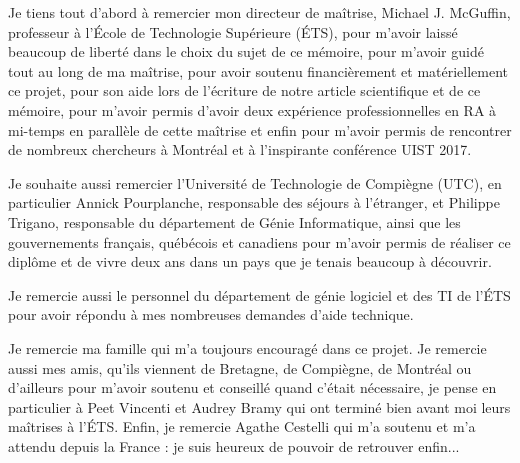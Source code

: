 Je tiens tout d'abord à remercier mon directeur de maîtrise, Michael J. McGuffin, professeur à l'École de Technologie Supérieure (ÉTS), pour m'avoir laissé beaucoup de liberté dans le choix du sujet de ce mémoire, pour m'avoir guidé tout au long de ma maîtrise, pour avoir soutenu financièrement et matériellement ce projet, pour son aide lors de l'écriture de notre article scientifique et de ce mémoire, pour m'avoir permis d'avoir deux expérience professionnelles en RA à mi-temps en parallèle de cette maîtrise et enfin pour m'avoir permis de rencontrer de nombreux chercheurs à Montréal et à l'inspirante conférence UIST 2017.

Je souhaite aussi remercier l'Université de Technologie de Compiègne (UTC), en particulier Annick Pourplanche, responsable des séjours à l'étranger, et Philippe Trigano, responsable du département de Génie Informatique, ainsi que les gouvernements français, québécois et canadiens pour m'avoir permis de réaliser ce diplôme et de vivre deux ans dans un pays que je tenais beaucoup à découvrir.

Je remercie aussi le personnel du département de génie logiciel et des TI de l'ÉTS pour avoir répondu à mes nombreuses demandes d'aide technique.

Je remercie ma famille qui m'a toujours encouragé dans ce projet. Je remercie aussi mes amis, qu'ils viennent de Bretagne, de Compiègne, de Montréal ou d'ailleurs pour m'avoir soutenu et conseillé quand c'était nécessaire, je pense en particulier à Peet Vincenti et Audrey Bramy qui ont terminé bien avant moi leurs maîtrises à l'ÉTS. Enfin, je remercie Agathe Cestelli qui m'a soutenu et m'a attendu depuis la France : je suis heureux de pouvoir de retrouver enfin...